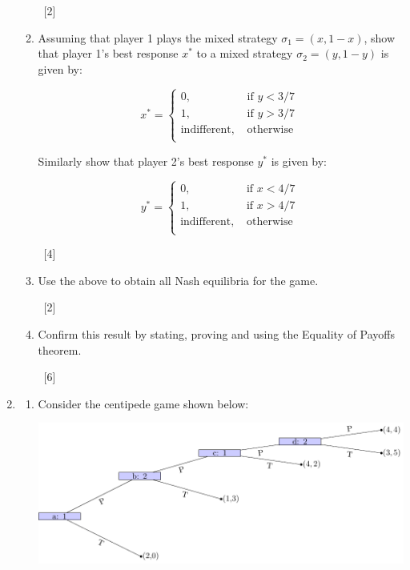 \documentclass[12pt,a4paper]{article}
\begin{document}
\begin{enumerate}
\begin{enumerate}
        ~\hfill{[2]}

        \item Assuming that player 1 plays the mixed strategy $\sigma_1=(x,1-x)$, show that player 1's best response $x^*$ to a mixed strategy $\sigma_2 = (y,1-y)$ is given by:


            \[
            x^*=\begin{cases}
                0,&\text{ if } y < 3/7\\
                1,&\text{ if } y > 3/7\\
                \text{indifferent},&\text{ otherwise }\\
            \end{cases}
            \]

            Similarly show that player 2's best response $y^*$ is given by:

            \[
            y^*=\begin{cases}
                0,&\text{ if } x < 4/7\\
                1,&\text{ if } x > 4/7\\
                \text{indifferent},&\text{ otherwise }\\
            \end{cases}
            \]

        ~\hfill{[4]}

        \item Use the above to obtain all Nash equilibria for the game.

        ~\hfill{[2]}

        \item Confirm this result by stating, proving and using the Equality of Payoffs theorem.

        ~\hfill{[6]}

    \end{enumerate}

\newpage
\item

    \begin{enumerate}

            \item Consider the centipede game shown below:

            \begin{center}
                \includegraphics[width=.8\textwidth]{images/mock-img01.pdf}
            \end{center}


\end{enumerate}
\end{enumerate}
\end{document}
